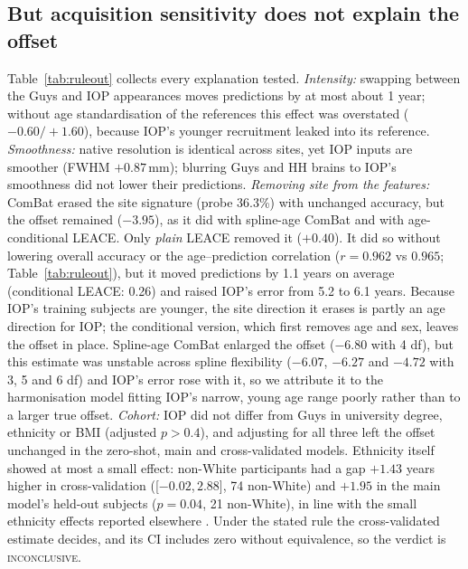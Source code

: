 \documentclass[conference]{IEEEtran}
\newcommand{\ci}[2]{[$#1$,\,$#2$]}
\begin{document}
\subsection{But acquisition sensitivity does not explain the offset}
Table~\ref{tab:ruleout} collects every explanation tested. \emph{Intensity:} swapping between the Guys and IOP appearances moves predictions by at most about 1 year; without age standardisation of the references this effect was overstated ($-0.60/+1.60$), because IOP's younger recruitment leaked into its reference. \emph{Smoothness:} native resolution is identical across sites, yet IOP inputs are smoother (FWHM $+0.87$\,mm); blurring Guys and HH brains to IOP's smoothness did not lower their predictions. \emph{Removing site from the features:} ComBat erased the site signature (probe 36.3\%) with unchanged accuracy, but the offset remained ($-3.95$), as it did with spline-age ComBat and with age-conditional LEACE. Only \emph{plain} LEACE removed it ($+0.40$). It did so without lowering overall accuracy or the age--prediction correlation ($r=0.962$ vs $0.965$; Table~\ref{tab:ruleout}), but it moved predictions by 1.1 years on average (conditional LEACE: 0.26) and raised IOP's error from 5.2 to 6.1 years. Because IOP's training subjects are younger, the site direction it erases is partly an age direction for IOP; the conditional version, which first removes age and sex, leaves the offset in place. Spline-age ComBat enlarged the offset ($-6.80$ with 4 df), but this estimate was unstable across spline flexibility ($-6.07$, $-6.27$ and $-4.72$ with 3, 5 and 6 df) and IOP's error rose with it, so we attribute it to the harmonisation model fitting IOP's narrow, young age range poorly rather than to a larger true offset. \emph{Cohort:} IOP did not differ from Guys in university degree, ethnicity or BMI (adjusted $p>0.4$), and adjusting for all three left the offset unchanged in the zero-shot, main and cross-validated models. Ethnicity itself showed at most a small effect: non-White participants had a gap $+1.43$ years higher in cross-validation (\ci{-0.02}{2.88}, 74 non-White) and $+1.95$ in the main model's held-out subjects ($p=0.04$, 21 non-White), in line with the small ethnicity effects reported elsewhere \cite{aguzin2026bias}. Under the stated rule the cross-validated estimate decides, and its CI includes zero without equivalence, so the verdict is \textsc{inconclusive}.
\end{document}
